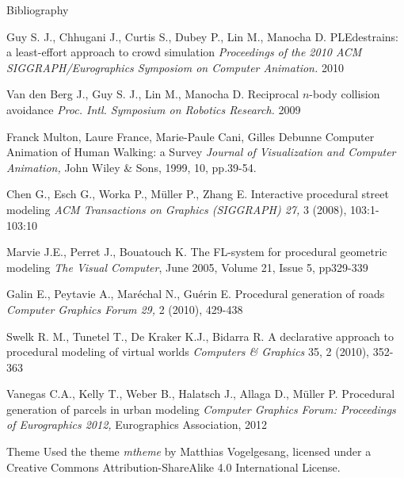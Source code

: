 \documentclass{beamer}
\begin{document}
\bgroup
{}
\begin{frame}[plain]{}
\end{frame}
\egroup


\begin{frame}[allowframebreaks]{Bibliography}
  \begin{thebibliography}{10}


    Guy S. J., Chhugani J., Curtis S., Dubey P., Lin M., Manocha D.
    \newblock PLEdestrains: a least-effort approach to crowd simulation
    \newblock \emph{Proceedings of the 2010 ACM SIGGRAPH/Eurographics Symposiom on Computer Animation.} 2010

    Van den Berg J., Guy S. J., Lin M., Manocha D.
    \newblock Reciprocal $n$-body collision avoidance
    \newblock \emph{Proc. Intl. Symposium on Robotics Research.} 2009

    Franck Multon, Laure France, Marie-Paule Cani, Gilles Debunne
    \newblock Computer Animation of Human Walking: a Survey
    \newblock \emph{Journal of Visualization and Computer Animation,} John Wiley \& Sons, 1999, 10, pp.39-54.


    Chen G., Esch G., Worka P., Müller P., Zhang E.
    \newblock Interactive procedural street modeling
    \newblock \emph{ACM Transactions on Graphics (SIGGRAPH) 27,} 3 (2008), 103:1-103:10



    Marvie J.E., Perret J., Bouatouch K.
    \newblock The FL-system for procedural geometric modeling
    \newblock \emph{The Visual Computer}, June 2005, Volume 21, Issue 5, pp329-339

    Galin E., Peytavie A., Maréchal N., Guérin E.
    \newblock Procedural generation of roads
    \newblock \emph{Computer Graphics Forum 29,} 2 (2010), 429-438

    Swelk R. M., Tunetel T., De Kraker K.J., Bidarra R.
    \newblock A declarative approach to procedural modeling of virtual worlds
    \newblock \emph{ Computers \& Graphics} 35, 2 (2010), 352-363

    Vanegas C.A., Kelly T., Weber B., Halatsch J., Allaga D., Müller P.
    \newblock Procedural generation of parcels in urban modeling
    \newblock \emph{Computer Graphics Forum: Proceedings of Eurographics 2012,} Eurographics Association, 2012

  \end{thebibliography} 
\end{frame}

\begin{frame}{Theme}
  Used the theme \emph{mtheme} by Matthias Vogelgesang, licensed under a Creative Commons
  Attribution-ShareAlike 4.0 International License.
\end{frame}
\end{document}

